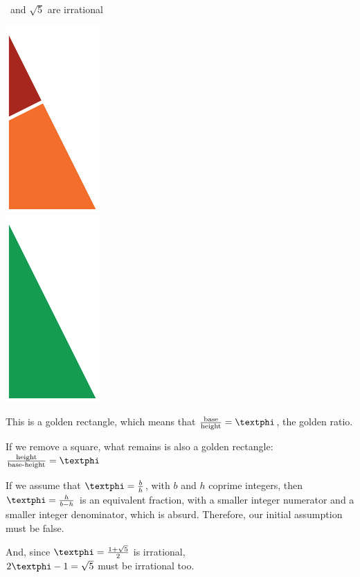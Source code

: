 \documentclass[14pt]{beamer}
\begin{document}
    \begin{frame}{\textphi\ and $\sqrt{5}$ are irrational}
        \begin{center}
            \begin{minipage}{0.45\textwidth}%
                \includegraphics[scale=0.750]{figures/figure020a.pdf} \\[2ex]
                \includegraphics[scale=0.750]{figures/figure020b.pdf} \\
            \end{minipage}\hfill\begin{minipage}{0.5\textwidth}
                \footnotesize
                This is a golden rectangle, which means that $\tfrac{\text{base}}{\text{height}} = \text{\textphi}$, the golden ratio.\bigskip

                If we remove a square, what remains is also a golden rectangle: $\tfrac{\text{height}}{\text{base-height}} = \text{\textphi}$\bigskip

                If we assume that $\text{\textphi} = \tfrac{b}{h}$, with $b$ and $h$ coprime integers, then $\text{\textphi} = \tfrac{h}{b-h}$ is an equivalent fraction, with a smaller integer numerator and a smaller integer denominator, which is absurd. Therefore, our initial assumption must be false.\bigskip

                And, since $\text{\textphi} =\tfrac{1+\sqrt{5}}{2}$ is irrational,\\[0.25ex]$2\text{\textphi} - 1 = \sqrt{5}$ must be irrational too.
            \end{minipage}
        \end{center}
    \end{frame}
\end{document}
